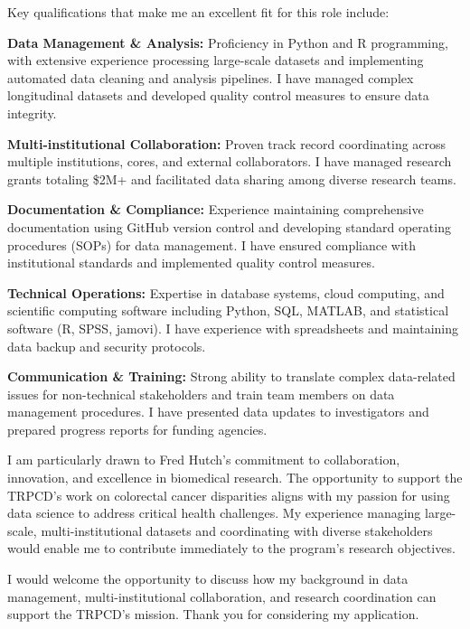 \documentclass[10.5pt, letterpaper]{russell}
\begin{document}
\begin{cvletter}
  Key qualifications that make me an excellent fit for this role include:

  \textbf{Data Management \& Analysis:} Proficiency in Python and R programming, with extensive experience processing large-scale datasets and implementing automated data cleaning and analysis pipelines. I have managed complex longitudinal datasets and developed quality control measures to ensure data integrity.

  \textbf{Multi-institutional Collaboration:} Proven track record coordinating across multiple institutions, cores, and external collaborators. I have managed research grants totaling \$2M+ and facilitated data sharing among diverse research teams.

  \textbf{Documentation \& Compliance:} Experience maintaining comprehensive documentation using GitHub version control and developing standard operating procedures (SOPs) for data management. I have ensured compliance with institutional standards and implemented quality control measures.

  \textbf{Technical Operations:} Expertise in database systems, cloud computing, and scientific computing software including Python, SQL, MATLAB, and statistical software (R, SPSS, jamovi). I have experience with spreadsheets and maintaining data backup and security protocols.

  \textbf{Communication \& Training:} Strong ability to translate complex data-related issues for non-technical stakeholders and train team members on data management procedures. I have presented data updates to investigators and prepared progress reports for funding agencies.

  I am particularly drawn to Fred Hutch's commitment to collaboration, innovation, and excellence in biomedical research. The opportunity to support the TRPCD's work on colorectal cancer disparities aligns with my passion for using data science to address critical health challenges. My experience managing large-scale, multi-institutional datasets and coordinating with diverse stakeholders would enable me to contribute immediately to the program's research objectives.

  I would welcome the opportunity to discuss how my background in data management, multi-institutional collaboration, and research coordination can support the TRPCD's mission. Thank you for considering my application.

\end{cvletter}

\makeletterclosing
\end{document}
